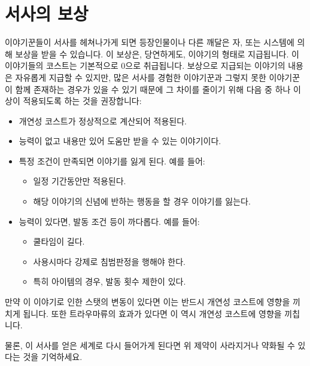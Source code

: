 \documentclass{report}
\begin{document}
	\hypertarget{reward}{}
	\section*{서사의 보상}
	이야기꾼들이 서사를 헤쳐나가게 되면 등장인물이나 다른 깨달은 자, 또는 시스템에 의해 보상을 받을 수 있습니다. 이 보상은, 당연하게도, 이야기의 형태로 지급됩니다. 이 이야기들의 코스트는 기본적으로 0으로 취급됩니다. 보상으로 지급되는 이야기의 내용은 자유롭게 지급할 수 있지만, 많은 서사를 경험한 이야기꾼과 그렇지 못한 이야기꾼이 함께 존재하는 경우가 있을 수 있기 때문에 그 차이를 줄이기 위해 다음 중 하나 이상이 적용되도록 하는 것을 권장합니다:
	\begin{itemize}
		\item 개연성 코스트가 정상적으로 계산되어 적용된다.
		\item 능력이 없고 내용만 있어 도움만 받을 수 있는 이야기이다.
		\item 특정 조건이 만족되면 이야기를 잃게 된다. 예를 들어:
		\begin{itemize}
			\item 일정 기간동안만 적용된다.
			\item 해당 이야기의 신념에 반하는 행동을 할 경우 이야기를 잃는다.
		\end{itemize}
		\item 능력이 있다면, 발동 조건 등이 까다롭다. 예를 들어:
		\begin{itemize}
			\item 쿨타임이 길다.
			\item 사용시마다 강제로 침범판정을 행해야 한다.
			\item 특히 아이템의 경우, 발동 횟수 제한이 있다.
		\end{itemize}
	\end{itemize}
	만약 이 이야기로 인한 스탯의 변동이 있다면 이는 반드시 개연성 코스트에 영향을 끼치게 됩니다. 또한 트라우마류의 효과가 있다면 이 역시 개연성 코스트에 영향을 끼칩니다.
	
	물론, 이 서사를 얻은 세계로 다시 들어가게 된다면 위 제약이 사라지거나 약화될 수 있다는 것을 기억하세요.
	
\end{document}

